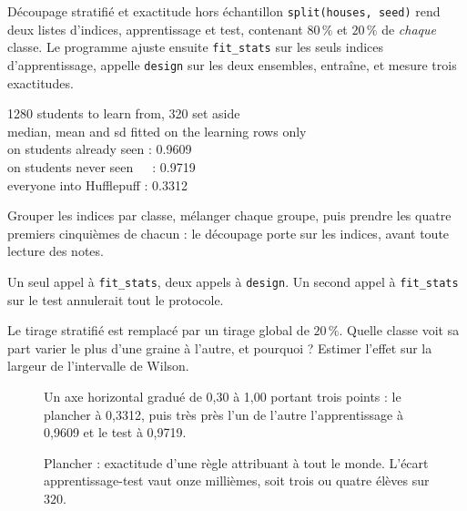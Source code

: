 \begin{tache}{Découpage stratifié et exactitude hors échantillon}
 \texttt{split(houses, seed)} rend deux listes d'indices,
apprentissage et test, contenant $80\,\%$ et $20\,\%$ de \emph{chaque} classe.
Le programme ajuste ensuite \texttt{fit\_stats} sur les seuls indices
d'apprentissage, appelle \texttt{design} sur les deux ensembles, entraîne, et
mesure trois exactitudes.

\begin{center}\ttfamily\footnotesize
1280 students to learn from, 320 set aside\\
median, mean and sd fitted on the learning rows only\\[3pt]
on students already seen : 0.9609\\
on students never seen\ \ \ : 0.9719\\
everyone into Hufflepuff : 0.3312
\end{center}

 Grouper les indices par classe, mélanger chaque groupe, puis
prendre les quatre premiers cinquièmes de chacun : le découpage porte sur les
indices, avant toute lecture des notes.

 Un seul appel à \texttt{fit\_stats}, deux appels à
\texttt{design}. Un second appel à \texttt{fit\_stats} sur le test annulerait
tout le protocole.

 Le tirage stratifié est remplacé par un tirage global de
$20\,\%$. Quelle classe voit sa part varier le plus d'une graine à l'autre, et
pourquoi ? Estimer l'effet sur la largeur de l'intervalle de Wilson.
\end{tache}

\begin{figure}[htbp]
\centering
\begin{graphique}{Un axe horizontal gradué de 0,30 à 1,00 portant trois points : le plancher à 0,3312, puis très près l'un de l'autre l'apprentissage à 0,9609 et le test à 0,9719.}
\end{graphique}
\caption{Plancher : exactitude d'une règle attribuant \Huff à tout le monde. L'écart
apprentissage-test vaut onze millièmes, soit trois ou quatre élèves sur $320$.}
\label{fig:echelle}
\end{figure}
\FloatBarrier

